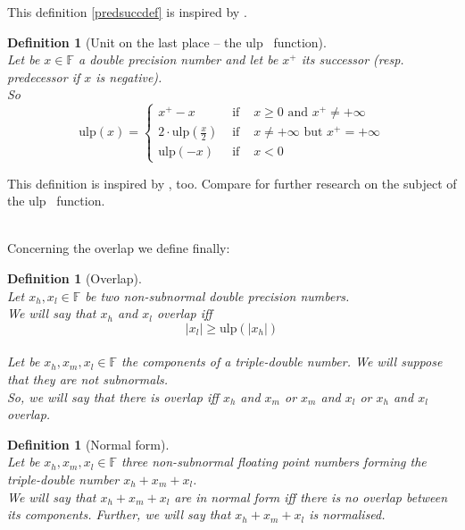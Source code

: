 \documentclass[a4paper,10pt,twoside]{article}
\newtheorem{definition}[theorem]{Definition}
\newcommand{\F}{\ensuremath{\mathbb {F}}}
\newcommand{\hi}{\ensuremath{\mathit{h}}}
\newcommand{\mi}{\ensuremath{\mathit{m}}}
\newcommand{\lo}{\ensuremath{\mathit{l}}}
\newcommand{\mUlp}{\ensuremath{\mathrm{ulp}}}
\begin{document}
This definition \ref{predsuccdef} is inspired by \cite{Defour-thesis}.
\begin{definition}[Unit on the last place -- the $\mUlp$~ function] \label{defulp} ~ \\ 
Let be $x \in \F$ a double precision number and let be $x^+$ its
successor (resp. predecessor if $x$ is negative). \\
So
$$\mUlp \left( x \right) = \left \lbrace 
                   \begin{array}{lll} x^+ - x & \mbox{ if } & x \geq 0 \mbox{ and } x^+ \not = + \infty \\ 
                     2 \cdot \mUlp\left( \frac{x}{2} \right) & \mbox{ if } & x \not = + \infty \mbox{ but } x^+ = + \infty\\
                     \mUlp \left( -x \right) & \mbox{ if } & x < 0 \end{array} \right.$$ 
\end{definition}  
This definition is inspired by \cite{Defour-thesis}, too. Compare \cite{Muller05INRIA} 
for further research on the subject of the $\mUlp$~ function.\\~\par
Concerning the overlap we define finally:
\begin{definition}[Overlap]\label{defoverlap}~\\
Let $x_\hi, x_\lo \in \F$ be two non-subnormal double precision numbers. \\
We will say that $x_\hi$ and $x_\lo$ overlap iff
$$\left \vert x_\lo \right \vert \geq \mUlp\left( \left \vert x_\hi \right 
\vert \right)$$~\\
Let be $x_\hi, x_\mi, x_\lo \in \F$ the components of a triple-double
number. We will suppose that they are not subnormals.\\
So, we will say that there is overlap iff 
$x_\hi$ and $x_\mi$ or $x_\mi$ and $x_\lo$ or $x_\hi$ and $x_\lo$ overlap.
\end{definition}
\begin{definition}[Normal form]~\\
Let be $x_\hi, x_\mi, x_\lo \in \F$ three non-subnormal floating point numbers
forming the triple-double number $x_\hi + x_\mi + x_\lo$. \\
We will say that $x_\hi + x_\mi + x_\lo$ are in normal form iff there is no
overlap between its components.
Further, we will say that $x_\hi + x_\mi + x_\lo$ is normalised.
\end{definition} \par
\end{document}
